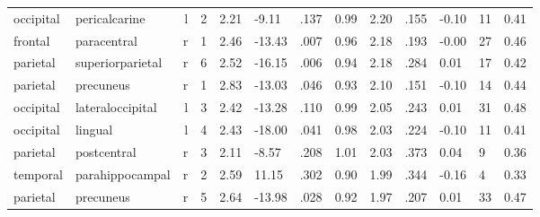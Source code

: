 \documentclass{article}
\begin{document}
\begin{longtable}{llrR{1.3cm}R{1cm}R{1.3cm}R{1cm}R{1cm}R{1.3cm}R{1cm}R{1.8cm}R{1.3cm}R{1.8cm}}
 occipital &             pericalcarine &    l &         2 &                  2.21 &            -9.11 &               .137 &                               0.99 &                          2.20 &                            .155 &  -0.10 &     11 &      0.41 \\
   frontal &               paracentral &    r &         1 &                  2.46 &           -13.43 &               .007 &                               0.96 &                          2.18 &                            .193 &  -0.00 &     27 &      0.46 \\
  parietal &          superiorparietal &    r &         6 &                  2.52 &           -16.15 &               .006 &                               0.94 &                          2.18 &                            .284 &   0.01 &     17 &      0.42 \\
  parietal &                 precuneus &    r &         1 &                  2.83 &           -13.03 &               .046 &                               0.93 &                          2.10 &                            .151 &  -0.10 &     14 &      0.44 \\
 occipital &          lateraloccipital &    l &         3 &                  2.42 &           -13.28 &               .110 &                               0.99 &                          2.05 &                            .243 &   0.01 &     31 &      0.48 \\
 occipital &                   lingual &    l &         4 &                  2.43 &           -18.00 &               .041 &                               0.98 &                          2.03 &                            .224 &  -0.10 &     11 &      0.41 \\
  parietal &               postcentral &    r &         3 &                  2.11 &            -8.57 &               .208 &                               1.01 &                          2.03 &                            .373 &   0.04 &      9 &      0.36 \\
  temporal &           parahippocampal &    r &         2 &                  2.59 &            11.15 &               .302 &                               0.90 &                          1.99 &                            .344 &  -0.16 &      4 &      0.33 \\
  parietal &                 precuneus &    r &         5 &                  2.64 &           -13.98 &               .028 &                               0.92 &                          1.97 &                            .207 &   0.01 &     33 &      0.47 \\

\end{longtable}
\end{document}
